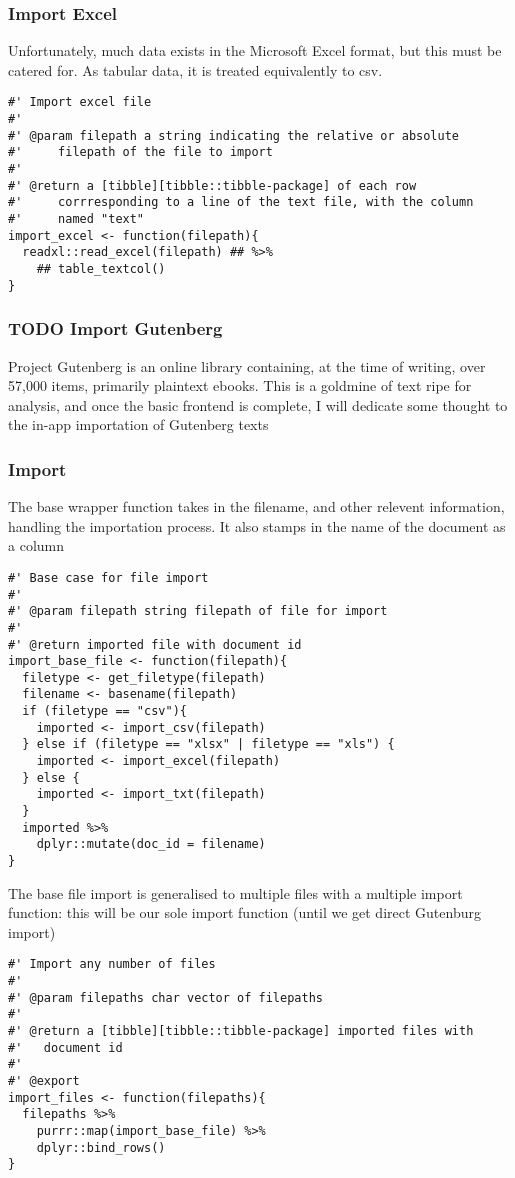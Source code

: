 \documentclass[a4paper, 11pt]{article}
\begin{document}
\subsubsection{Import Excel}
\label{sec:org864e55f}
Unfortunately, much data exists in the Microsoft Excel format, but
this must be catered for. As tabular data, it is treated equivalently
to csv.
\begin{verbatim}
#' Import excel file
#'
#' @param filepath a string indicating the relative or absolute
#'     filepath of the file to import
#'
#' @return a [tibble][tibble::tibble-package] of each row
#'     corrresponding to a line of the text file, with the column
#'     named "text"
import_excel <- function(filepath){
  readxl::read_excel(filepath) ## %>%
    ## table_textcol()
}
\end{verbatim}
\subsubsection{{\bfseries\sffamily TODO} Import Gutenberg}
\label{sec:org0d82755}
Project Gutenberg is an online library containing, at the time of
writing, over 57,000 items, primarily plaintext ebooks. This is a
goldmine of text ripe for analysis, and once the basic frontend is
complete, I will dedicate some thought to the in-app importation of
Gutenberg texts
\subsubsection{Import}
\label{sec:orgad62037}
The base wrapper function takes in the filename, and other relevent
information, handling the importation process. It also stamps in the
name of the document as a column
\begin{verbatim}
#' Base case for file import
#'
#' @param filepath string filepath of file for import
#'
#' @return imported file with document id
import_base_file <- function(filepath){
  filetype <- get_filetype(filepath)
  filename <- basename(filepath)
  if (filetype == "csv"){
    imported <- import_csv(filepath)
  } else if (filetype == "xlsx" | filetype == "xls") {
    imported <- import_excel(filepath)
  } else {
    imported <- import_txt(filepath)
  }
  imported %>%
    dplyr::mutate(doc_id = filename)
}
\end{verbatim}
The base file import is generalised to multiple files with a multiple
import function: this will be our sole import function (until we get
direct Gutenburg import)
\begin{verbatim}
#' Import any number of files
#'
#' @param filepaths char vector of filepaths
#'
#' @return a [tibble][tibble::tibble-package] imported files with
#'   document id
#' 
#' @export
import_files <- function(filepaths){
  filepaths %>%
    purrr::map(import_base_file) %>%
    dplyr::bind_rows()
}
\end{verbatim}
\end{document}
